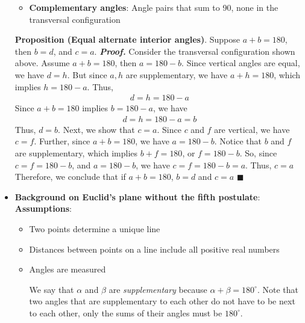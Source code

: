 \documentclass{report}
\begin{document}
\begin{itemize}
\begin{itemize}
                \item \textbf{Complementary angles}: Angle pairs that sum to 90, none in the transversal configuration
            \end{itemize}
            \bigbreak \noindent 
            \textbf{Proposition (Equal alternate interior angles)}. Suppose $a + b = 180$, then $b = d$, and $c=a $.
            \bigbreak \noindent 
            \textbf{\textit{Proof.}} Consider the transversal configuration shown above. Assume $a+b = 180$, then $a=180-b$. Since vertical angles are equal, we have $d=h$. But since $a,h$ are supplementary, we have $a + h = 180$, which implies $h = 180 -a$. Thus,
            \begin{align*}
                d = h = 180 - a
            \end{align*}
            Since $a+b = 180$ implies $ b = 180-a$, we have
            \begin{align*}
                 d = h = 180 - a = b
            \end{align*}
            \bigbreak \noindent 
            Thus, $d=b$. Next, we show that $c=a$. Since $c$ and $f$ are vertical, we have $c = f$. Further, since $a + b =180$, we have $a = 180 -b$. Notice that $b$ and $f$ are supplementary, which implies $b + f = 180$, or $f = 180 - b $. So, since $c=f = 180 -b$, and $a = 180-b$, we have $c = f = 180 - b = a$. Thus, $c=a$
            \bigbreak \noindent 
            Therefore, we conclude that if $a+ b =180$, $b = d$ and $c = a $ \hspace*{\fill}$\blacksquare$
        \item \textbf{Background on Euclid's plane without the fifth postulate}:
            \bigbreak \noindent 
            \textbf{Assumptions}:
            \begin{itemize}
                \item Two points determine a unique line
                \item Distances between points on a line include all positive real numbers
                \item Angles are measured
                    \bigbreak \noindent 
                    \begin{figure}[ht]
                        \centering
                        \label{fig:supp}
                \end{figure}
                We say that $\alpha$ and $\beta$ are \textit{supplementary} because $\alpha + \beta = 180^{\circ}$. Note that two angles that are supplementary to each other do not have to be next to each other, only the sums of their angles must be $180^{\circ}$. 

\end{itemize}
\end{itemize}
\end{document}
